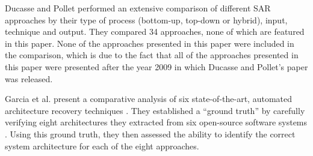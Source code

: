 Ducasse and Pollet \cite{Ducasse2009} performed an extensive comparison of different SAR approaches by their type of process (bottom-up, top-down or hybrid), input, technique and output.
They compared 34 approaches, none of which are featured in this paper.
None of the approaches presented in this paper were included in the comparison, which is due to the fact that all of the approaches presented in this paper were presented after the year 2009 in which Ducasse and Pollet's paper was released.

Garcia et al. present a comparative analysis of six state-of-the-art, automated architecture recovery techniques \cite{Garcia2013comparative}.
They established a ``ground truth'' by carefully verifying eight architectures they extracted from six open-source software systems \cite{Garcia2013comparative}.
Using this ground truth, they then assessed the ability to identify the correct system architecture for each of the eight approaches.